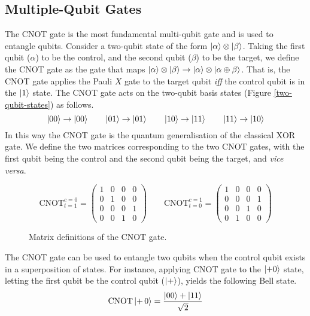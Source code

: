 \subsection{Multiple-Qubit Gates}

The CNOT gate is the most fundamental multi-qubit gate and is used to entangle qubits. Consider a two-qubit state of the form $\ket \alpha \otimes \ket \beta$. Taking the first qubit ($\alpha$) to be the control, and the second qubit ($\beta$) to be the target, we define the CNOT gate as the gate that maps $\ket\alpha\otimes\ket\beta \rightarrow \ket\alpha\otimes\ket{\alpha\oplus\beta}$. That is, the CNOT gate applies the Pauli $X$ gate to the target qubit \textit{iff} the control qubit is in the $\ket 1$ state. The CNOT gate acts on the two-qubit basis states (Figure \ref{two-qubit-states}) as follows.
\begin{equation*}
    \ket{00} \rightarrow \ket {00} \qquad
    \ket{01} \rightarrow \ket {01} \qquad
    \ket{10} \rightarrow \ket {11} \qquad
    \ket{11} \rightarrow \ket {10}
\end{equation*}
In this way the CNOT gate is the quantum generalisation of the classical XOR gate. We define the two matrices corresponding to the two CNOT gates, with the first qubit being the control and the second qubit being the target, and \textit{vice versa}.

\begin{figure}[H]
    \centering
    \begin{equation*}
    \text{CNOT}^{c=0}_{t=1} =
        \begin{pmatrix}
            1 & 0 & 0 & 0 \\
            0 & 1 & 0 & 0 \\
            0 & 0 & 0 & 1 \\
            0 & 0 & 1 & 0
        \end{pmatrix} \qquad
        \text{CNOT}^{c=1}_{t=0} =
        \begin{pmatrix}
            1 & 0 & 0 & 0 \\
            0 & 0 & 0 & 1 \\
            0 & 0 & 1 & 0 \\
            0 & 1 & 0 & 0
        \end{pmatrix}
    \end{equation*}
    \caption{Matrix definitions of the CNOT gate.}
    \label{cnot-definition}
\end{figure}

The CNOT gate can be used to entangle two qubits when the control qubit exists in a superposition of states. For instance, applying CNOT gate to the $\ket{+0}$ state, letting the first qubit be the control qubit ($\ket +$), yields the following Bell state.
\begin{equation*}
    \text{CNOT} \ket{+ \, 0} = \frac{\ket{00} + \ket{11}}{\sqrt 2}
\end{equation*}

